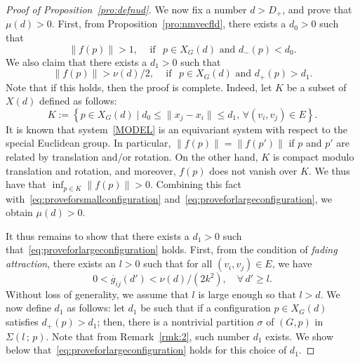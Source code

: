 \documentclass[10pt,twocolumn,twoside]{IEEEtran}
\newcommand{\ol}{\overline}
\renewcommand{\(}{\left (}
\renewcommand{\)}{\right )}
\renewcommand{\;}{\,;\,}
\begin{document}
\begin{proof}[Proof of Proposition~\ref{pro:defnud}]
We now fix a number $d > D_+ $, and prove that $\mu(d) > 0$. First, from Proposition~\ref{pro:nmvecfld}, there exists a $d_0 > 0$ such that 
\begin{equation}\label{eq:proveforsmallconfiguration}
\| f(p) \| > 1, \hspace{10pt} \mbox{ if } \hspace{5pt} p \in X_{G}(d) \mbox{ and }  d_-(p) < d_0.
\end{equation}
We also claim that there exists a  $d_1 > 0$ such that 
\begin{equation}\label{eq:proveforlargeconfiguration}
\|f(p)\| > \nu(d) /2, \hspace{10pt} \mbox{ if } \hspace{5pt} p \in X_{G}(d) \mbox{ and }  d_+(p) > d_1.
\end{equation}
Note that if this holds, then the proof is complete. Indeed, let $K$ be a subset of $X(d)$ defined as follows: 
$$
K := \left\{ p\in X_G(d) \mid d_0 \le \|x_j - x_i\| \le d_1, \, \forall (v_i,v_j) \in E\right\}.
$$
It is known that system~\eqref{MODEL} is an equivariant system with respect to the special Euclidean group. In particular, $\|f(p)\| = \|f(p')\|$ if $p$ and $p'$ are related by translation and/or rotation. On the other hand,  $K$ is compact modulo translation and rotation, and moreover, $f(p)$ does not vanish over $K$. We thus have that 
$
\inf_{p\in K} \| f(p) \|> 0
$. 
Combining this fact with~\eqref{eq:proveforsmallconfiguration} and~\eqref{eq:proveforlargeconfiguration}, we obtain $\mu(d) > 0$. 

It thus remains to show that there exists a $d_1 > 0$  such that~\eqref{eq:proveforlargeconfiguration} holds. 
First, from the condition of {\it fading attraction}, there exists an $l > 0$ such that for all $(v_i,v_j) \in E$, we have  
\begin{equation}\label{eq:verylargedistance}
0 < \ol g_{ij}(d') < \nu(d) / (2k^2), \hspace{10pt} \, \forall\, d' \ge l. 
\end{equation}
Without loss of generality, we assume that $l$ is large enough so that $l > d$. 
We now define $d_1$ as follows: let $d_1$ be such that if a configuration $p\in X_{G}(d)$ satisfies $d_+(p) > d_1$; then,  
there is a nontrivial partition $\sigma$ of $(G,p)$ in $\Sigma(l\; p)$. Note that  from Remark~\ref{rmk:2}, such number $d_1$ exists. We show below that~\eqref{eq:proveforlargeconfiguration} holds for this choice of $d_1$. 



\end{proof}
\end{document}

